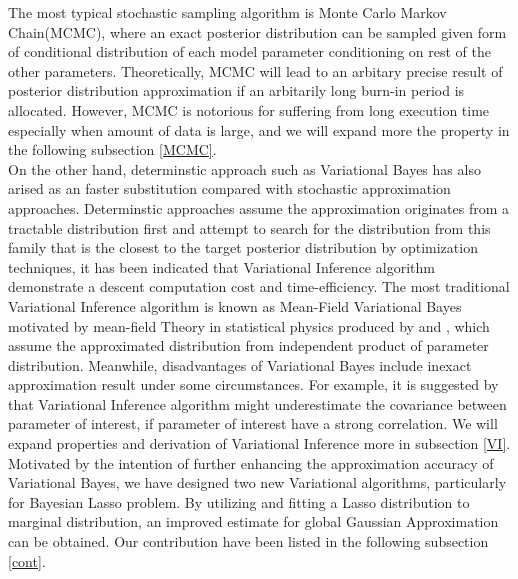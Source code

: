 The most typical stochastic sampling algorithm is Monte Carlo Markov Chain(MCMC), where an exact posterior distribution can be sampled given form of conditional distribution of each model parameter conditioning on rest of the other parameters. Theoretically, MCMC will lead to an arbitary precise result of posterior distribution approximation if an arbitarily long burn-in period is allocated. However, MCMC is notorious for suffering from long execution time especially when amount of data is large, and we will expand more the property in the following subsection \ref{MCMC}.\\
On the other hand, determinstic approach such as Variational Bayes has also arised as an faster substitution compared with stochastic approximation approaches. Determinstic approaches assume the approximation originates from a tractable distribution first and attempt to search for the distribution from this family that is the closest to the target posterior distribution by optimization techniques, it has been indicated that Variational Inference algorithm demonstrate a descent computation cost and time-efficiency. 
The most traditional Variational Inference algorithm is known as Mean-Field Variational Bayes motivated by mean-field Theory in statistical physics produced by 
\cite{jordan_ghahramani_jaakkola_saul_1998} and \cite{attias_1999}, which assume the approximated distribution from independent product of parameter distribution.
Meanwhile, disadvantages of Variational Bayes include inexact approximation result under some circumstances. For example, it is suggested by \cite{Bishop_2006} that Variational Inference algorithm might underestimate the covariance between parameter of interest, if parameter of interest have a strong correlation. We will expand properties and derivation of Variational Inference more in subsection \ref{VI}.\\
Motivated by the intention of further enhancing the approximation accuracy of Variational Bayes, we have designed two new Variational algorithms, particularly for Bayesian Lasso problem. By utilizing and fitting a Lasso distribution to marginal distribution, an improved estimate for global Gaussian Approximation can be obtained. Our contribution have been listed in the following subsection \ref{cont}.\\


